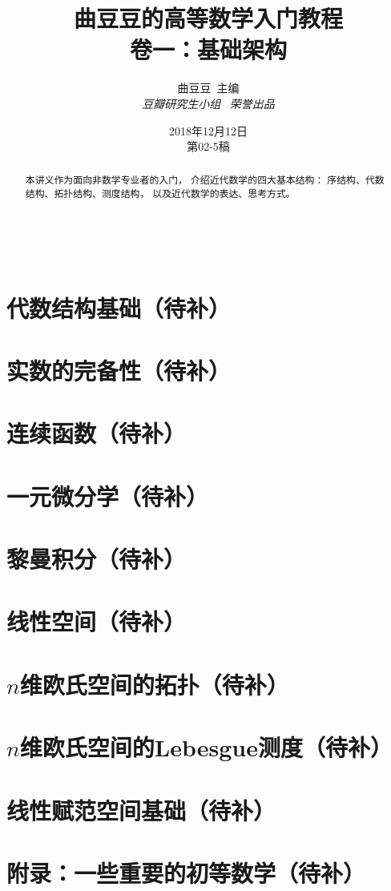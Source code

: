\documentclass[a4paper, 11pt]{article} %
\title{\textbf{曲豆豆的高等数学入门教程}\\$\,$\\%
卷一：基础架构} %
\author{\textsc{曲豆豆\,\,\,主编} %
\\{\textit{豆瓣研究生小组\,\,\,\,\,荣誉出品}}} %
\date{2018年12月12日\\
第02-5稿} %
\makeatletter
\renewcommand{\maketitle}{ %
\begin{center} %
{\Huge\@title} %

\vspace{50pt} %

{\Large\@author} %
\\\@date %

\vspace{20pt} %
\end{center}
}
\makeatother
\begin{document}
\maketitle


\begin{abstract}
本讲义作为面向非数学专业者的入门，
介绍近代数学的四大基本结构：
序结构、代数结构、拓扑结构、测度结构，
以及近代数学的表达、思考方式。
\end{abstract}

\tableofcontents
\newpage

\newpage




\section{代数结构基础（待补）}
\section{实数的完备性（待补）}
\section{连续函数（待补）}
\section{一元微分学（待补）}
\section{黎曼积分（待补）}
\section{线性空间（待补）}
\section{$n$维欧氏空间的拓扑（待补）}
\section{$n$维欧氏空间的Lebesgue测度（待补）}
\section{线性赋范空间基础（待补）}
\section{附录：一些重要的初等数学（待补）}
\end{document}
